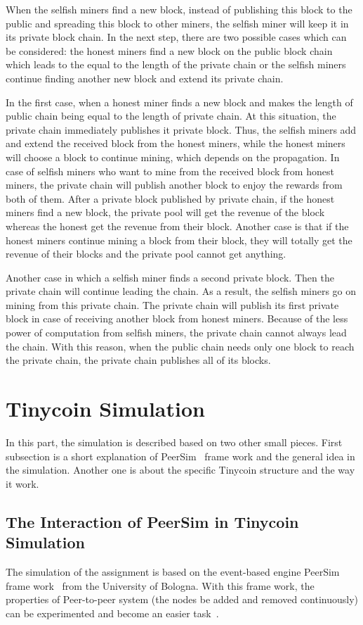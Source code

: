 \documentclass[runningheads,a4paper]{llncs}
\begin{document}
When the selfish miners find a new block, instead of publishing this block to the public and spreading this block to other miners,
the selfish miner will keep it in its private block chain.
In the next step, there are two possible cases which can be considered: the honest miners find a new block on the public block chain which leads to the equal to the length of the private chain
or the selfish miners continue finding another new block and extend its private chain.

In the first case, when a honest miner finds a new block and makes the length of public chain being equal to the length of private chain. At this situation, the private chain immediately publishes it private block.
Thus, the selfish miners add and extend the received block from the honest miners, while the honest miners will choose a block to continue mining, which depends on the propagation.
In case of selfish miners who want to mine from the received block from honest miners, the private chain will publish another block to enjoy the rewards from both of them.
After a private block published by private chain, if the honest miners find a new block, the private pool will get the revenue of the block whereas the honest get the revenue from their block.
Another case is that if the honest miners continue mining a block from their block, they will totally get the revenue of their blocks and the private pool cannot get anything.

Another case in which a selfish miner finds a second private block. 
Then the private chain will continue leading the chain.
As a result, the selfish miners go on mining from this private chain.
The private chain will publish its first private block in case of receiving another block from honest miners.
Because of the less power of computation from selfish miners, the private chain cannot always lead the chain.
With this reason, when the public chain needs only one block to reach the private chain, the private chain publishes all of its blocks.	

\section{Tinycoin Simulation}
\label{TS}
In this part, the simulation is described based on two other small pieces. First subsection is a short explanation of PeerSim~\cite{jesi2005peersim} frame work and the general idea in the simulation. Another one is about the specific Tinycoin structure and the way it work.

\subsection{The Interaction of PeerSim in Tinycoin Simulation}
The simulation of the assignment is based on the event-based engine PeerSim frame work~\cite{jesi2005peersim} from the University of Bologna.
With this frame work, the properties of Peer-to-peer system (the nodes be added and removed continuously) can be experimented and become an easier task~\cite{jesi2005peersim}.
\end{document}
